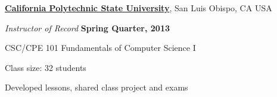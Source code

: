 \documentclass[10pt]{article}
\begin{document}
\href{http://www.calpoly.edu/}{\textbf{California Polytechnic State University}},
San Luis Obispo, CA USA
\begin{outerlist}
\item[] \textit{Instructor of Record}%
    \hfill \textbf{Spring Quarter, 2013 }
    \begin{innerlist}%
       \item CSC/CPE 101 Fundamentals of Computer Science I %
       \item Class size: 32 students 
       \item Developed lessons, shared class project and exams

\end{innerlist}

\end{outerlist}
\end{document}
